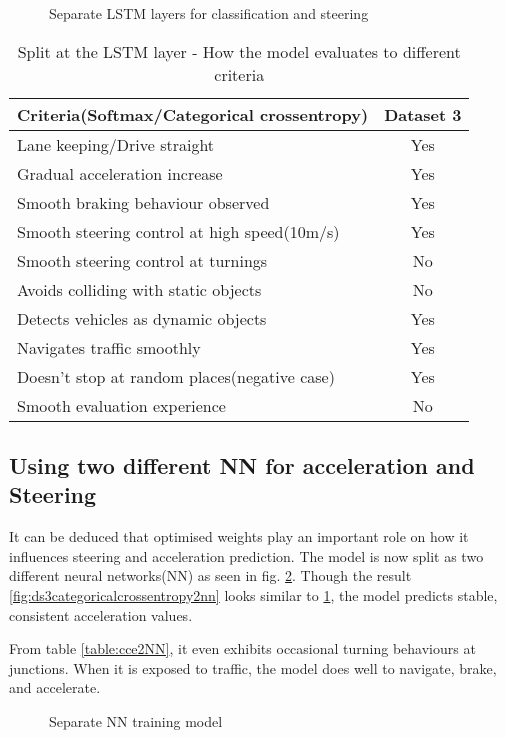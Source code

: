 \begin{figure}[!ht]
	\centering
    \def\svgwidth{\textwidth}
    \caption{Separate LSTM layers for classification and steering}
    \label{fig:ds3categoricalcrossentropylstm}
\end{figure}
\begin{table}[!ht]
    \centering
\begin{tabular}{lc}
    \toprule
    Criteria(Softmax/Categorical crossentropy)  & Dataset 3 \\\midrule
    Lane keeping/Drive straight  & Yes  \\
    Gradual acceleration increase  & Yes\\
    Smooth braking behaviour observed & Yes \\
    Smooth steering control at high speed(10m/s) & Yes \\
    Smooth steering control at turnings & No\\
    Avoids colliding with static objects & No \\
    Detects vehicles as dynamic objects & Yes \\
    Navigates traffic smoothly & Yes\\
    Doesn't stop at random places(negative case) & Yes \\
    Smooth evaluation experience & No \\\bottomrule

\end{tabular}
\caption{Split at the LSTM layer - How the model evaluates to different criteria}
\label{table:cceLSTM}
\end{table}

\subsection{Using two different NN for acceleration and
Steering}
It can be deduced that optimised weights play an important role on how it influences
steering and acceleration prediction. The model is now split as two different neural
networks(NN) as seen in fig. \ref{fig:steeringnnsplit}. Though the result
\ref{fig:ds3categoricalcrossentropy2nn} looks similar to
\ref{fig:ds3categoricalcrossentropylstm}, the model predicts stable, consistent
acceleration values.

From table \ref{table:cce2NN}, it even exhibits occasional turning behaviours at junctions. When it
is exposed to traffic, the model does well to navigate, brake, and accelerate.
\begin{figure}[!ht]
	\centering
    \def\svgwidth{0.25\textwidth}
    \caption{Separate NN training model}
    \label{fig:steeringnnsplit}
\end{figure}


